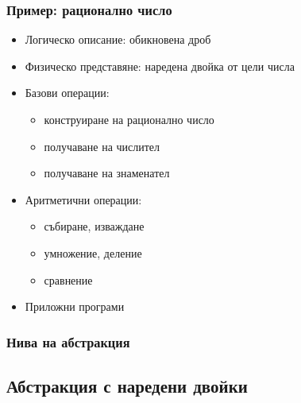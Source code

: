 \documentclass[alsotrans]{beamerswitch}
\begin{document}
\begin{frame}[<+->]
  \frametitle{Пример: рационално число}

  \begin{itemize}
  \item Логическо описание: обикновена дроб
  \item Физическо представяне: наредена двойка от цели числа
  \item Базови операции:
    \begin{itemize}[<.->]
    \item конструиране на рационално число
    \item получаване на числител
    \item получаване на знаменател
    \end{itemize}
  \item Аритметични операции:
    \begin{itemize}[<.->]
    \item събиране, изваждане
    \item умножение, деление
    \item сравнение
    \end{itemize}
  \item Приложни програми
  \end{itemize}
\end{frame}

\begin{frame}
  \frametitle{Нива на абстракция}

  \begin{center}
  \end{center}
\end{frame}

\subsection{Абстракция с наредени двойки}
\end{document}

